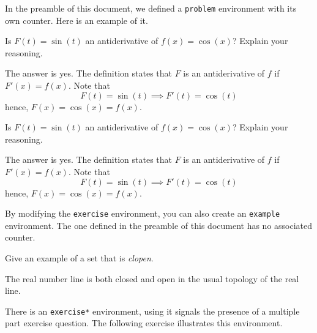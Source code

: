 \documentclass{article}
\newcounter{probno}[section]
\renewcommand{\theprobno}{\thesection.\arabic{probno}}
\newenvironment{problem}{%
\renewcommand\exlabel{Problem}%
\renewcommand\exlabelformat{\textbf{\exlabel\ \theprobno.}}%
\renewcommand\exsllabelformat
   {\noexpand\textbf{\exlabel\ \theprobno.}}%
\renewcommand\exrtnlabelformat{$\blacktriangleleft$}%
\renewcommand\exsecrunhead{Solutions to Problems}%
\begin{exercise}[probno]}
{\end{exercise}}
\newenvironment{example}{%
\renewcommand\exlabel{Example}%
\renewcommand\exlabelformat{\textbf{\exlabel.}}%
\renewcommand\exrtnlabelformat{$\square$}%
\SolutionsAfter
\begin{exercise}[0]}%
{\end{exercise}}
\begin{document}
In the preamble of this document, we defined a \texttt{problem}
environment with its own counter.  Here is an example of it.

\begin{problem}
Is $F(t)=\sin(t)$ an antiderivative of $f(x)=\cos(x)$?  Explain
your reasoning.
\begin{solution}
The answer is yes. The definition states that $F$ is an
antiderivative of $f$ if $F'(x)=f(x)$.  Note that
$$
       F(t)=\sin(t) \implies F'(t) = \cos(t)
$$
hence, $F(x) = \cos(x) = f(x)$.
\end{solution}
\end{problem}

\begin{problem}
Is $F(t)=\sin(t)$ an antiderivative of $f(x)=\cos(x)$?  Explain
your reasoning.
\begin{solution}
The answer is yes. The definition states that $F$ is an
antiderivative of $f$ if $F'(x)=f(x)$.  Note that
$$
       F(t)=\sin(t) \implies F'(t) = \cos(t)
$$
hence, $F(x) = \cos(x) = f(x)$.
\end{solution}
\end{problem}

\noindent By modifying the \texttt{exercise} environment, you can
also create an \texttt{example} environment.  The one defined in
the preamble of this document has no associated counter.

\begin{example}
Give an example of a set that is \textit{clopen}.
\begin{solution}
The real number line is both closed and open in the usual topology of the
real line.%
\end{solution}
\end{example}

There is an \texttt{exercise*} environment, using it signals the presence
of a multiple part exercise question. The following exercise illustrates
this environment.
\end{document}
